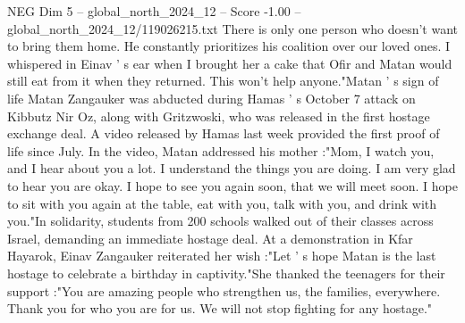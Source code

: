 \begin{textsample}{NEG Dim 5 – global\_north\_2024\_12 – Score -1.00 – global\_north\_2024\_12/119026215.txt}
There is only one person who doesn't want to bring them home.
He constantly prioritizes his coalition over our loved ones.
I whispered in Einav ' s ear when I brought her a cake that Ofir and Matan would still eat from it when they returned.
This won't help anyone."Matan ' s sign of life Matan Zangauker was abducted during Hamas ' s October 7 attack on Kibbutz Nir Oz, along with Gritzwoski, who was released in the first hostage exchange deal.
A video released by Hamas last week provided the first proof of life since July.
In the video, Matan addressed his mother :"Mom, I watch you, and I hear about you a lot.
I understand the things you are doing.
I am very glad to hear you are okay.
I hope to see you again soon, that we will meet soon.
I hope to sit with you again at the table, eat with you, talk with you, and drink with you."In solidarity, students from 200 schools walked out of their classes across Israel, demanding an immediate hostage deal.
At a demonstration in Kfar Hayarok, Einav Zangauker reiterated her wish :"Let ' s hope Matan is the last hostage to celebrate a birthday in captivity."She thanked the teenagers for their support :"You are amazing people who strengthen us, the families, everywhere.
Thank you for who you are for us.
We will not stop fighting for any hostage."

\end{textsample}
